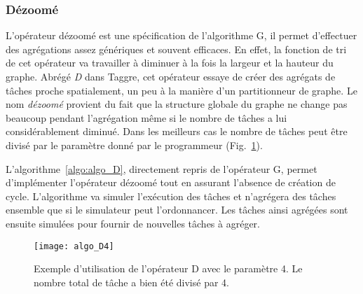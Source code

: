 \subsubsection{Dézoomé}
L'opérateur dézoomé est une spécification de l'algorithme G, il permet d'effectuer des agrégations assez génériques et souvent efficaces.
%
En effet, la fonction de tri de cet opérateur va travailler à diminuer à la fois la largeur et la hauteur du graphe.
%
Abrégé {\em D} dans Taggre, cet opérateur essaye de créer des agrégats de tâches proche spatialement, un peu à la manière d'un partitionneur de graphe.
%
Le nom {\em dézoomé} provient du fait que la structure globale du graphe ne change pas beaucoup pendant l'agrégation même si le nombre de tâches a lui considérablement diminué.
%
Dans les meilleurs cas le nombre de tâches peut être divisé par le paramètre donné par le programmeur (Fig.~\ref{fig:algo_D4}).


L'algorithme~\ref{algo:algo_D}, directement repris de l'opérateur G, permet d'implémenter l'opérateur dézoomé tout en assurant l'absence de création de cycle.
%
L'algorithme va simuler l'exécution des tâches et n'agrégera des tâches ensemble que si le simulateur peut l'ordonnancer.
%
Les tâches ainsi agrégées sont ensuite simulées pour fournir de nouvelles tâches à agréger.



\begin{figure}
  \centering
  \texttt{[image: algo\_D4]}
  \caption{Exemple d'utilisation de l'opérateur D avec le paramètre 4. Le nombre total de tâche a bien été divisé par 4.}
  \label{fig:algo_D4}
\end{figure}

